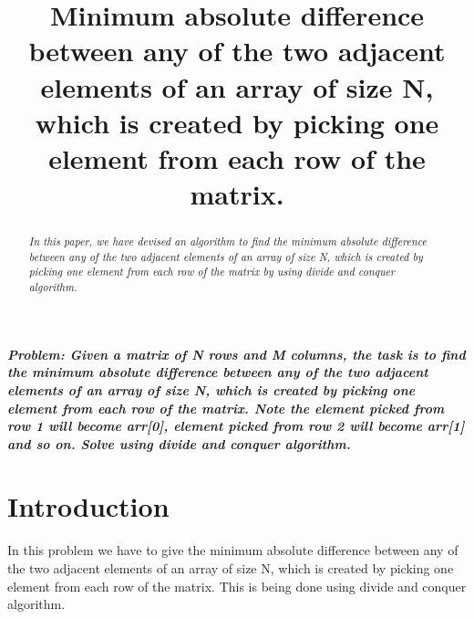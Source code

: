 \documentclass[conference]{IEEEtran}
\begin{document}
\title{Minimum absolute difference between any of the two adjacent elements of an array of size N, which is created by picking one element from each row of the matrix.\\

 
}

\author{
\and
{}
\and
{}


}

\maketitle
\textbf{\emph{Problem: Given a matrix of N rows and M columns, the task is to find the minimum absolute difference between any of the two adjacent elements of an array of size N, which is created by picking one element from each row of the matrix. Note the element picked from row 1 will become arr[0], element picked from row 2 will become arr[1] and so on. Solve using divide and conquer algorithm.}}\\


\begin{abstract}
\emph{In this paper, we have devised an algorithm to find the minimum absolute difference between any of the two adjacent elements of an array of size N, which is created by picking one element from each row of the matrix by using divide and conquer algorithm.}
\end{abstract}



\section{Introduction}
In this problem we have to give the minimum absolute difference between any of the two adjacent elements of an array of size N, which is created by picking one element from each row of the matrix. This is being done using divide and conquer algorithm.\\
\end{document}

